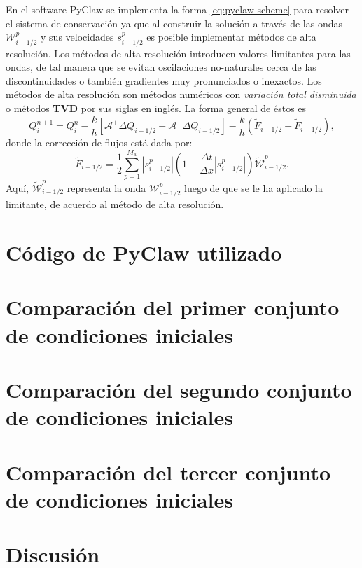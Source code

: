 En el software PyClaw se implementa la forma \eqref{eq:pyclaw-scheme} para resolver el sistema de conservación ya que al construir la solución a través de las ondas $\mathcal{W}_{i-1/2}^{p}$ y sus velocidades $s_{i-1/2}^{p}$ es posible implementar métodos de alta resolución. Los métodos de alta resolución introducen valores limitantes para las ondas, de tal manera que se evitan oscilaciones no-naturales cerca de las discontinuidades o también gradientes muy pronunciados o inexactos. Los métodos de alta resolución son métodos numéricos con \textit{variación total disminuida} o métodos \textbf{TVD} por sus siglas en inglés. La forma general de éstos es
\begin{equation}
	Q_{i}^{n+1} = Q_{i}^{n} - \frac{k}{h}\left[\mathcal{A}^{+}\Delta Q_{i-1/2} + \mathcal{A}^{-}\Delta Q_{i-1/2}\right] - \frac{k}{h}\left(\tilde{F}_{i+1/2} - \tilde{F}_{i-1/2}\right),
\end{equation}
donde la corrección de flujos está dada por:
\begin{equation}
	\tilde{F}_{i-1 / 2}=\frac{1}{2} \sum_{p=1}^{M_w}\left|s_{i-1 / 2}^p\right|\left(1-\frac{\Delta t}{\Delta x}\left|s_{i-1 / 2}^p\right|\right) \tilde{\mathcal{W}}_{i-1 / 2}^p .
\end{equation}
Aquí, $\tilde{\mathcal{W}}_{i-1 / 2}^p$ representa la onda ${\mathcal{W}}_{i-1 / 2}^p$ luego de que se le ha aplicado la limitante, de acuerdo al método de alta resolución.

\section{Código de PyClaw utilizado}
\section{Comparación del primer conjunto de condiciones iniciales}
\section{Comparación del segundo conjunto de condiciones iniciales}
\section{Comparación del tercer conjunto de condiciones iniciales}

\section{Discusión}
%

